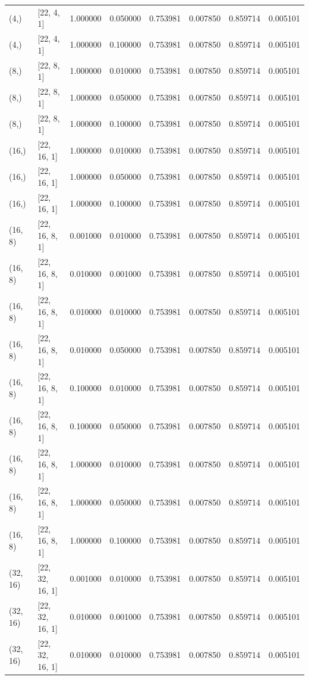 \begin{tabular}{llrrrrrr}
(4,) & [22, 4, 1] & 1.000000 & 0.050000 & 0.753981 & 0.007850 & 0.859714 & 0.005101 \\
(4,) & [22, 4, 1] & 1.000000 & 0.100000 & 0.753981 & 0.007850 & 0.859714 & 0.005101 \\
(8,) & [22, 8, 1] & 1.000000 & 0.010000 & 0.753981 & 0.007850 & 0.859714 & 0.005101 \\
(8,) & [22, 8, 1] & 1.000000 & 0.050000 & 0.753981 & 0.007850 & 0.859714 & 0.005101 \\
(8,) & [22, 8, 1] & 1.000000 & 0.100000 & 0.753981 & 0.007850 & 0.859714 & 0.005101 \\
(16,) & [22, 16, 1] & 1.000000 & 0.010000 & 0.753981 & 0.007850 & 0.859714 & 0.005101 \\
(16,) & [22, 16, 1] & 1.000000 & 0.050000 & 0.753981 & 0.007850 & 0.859714 & 0.005101 \\
(16,) & [22, 16, 1] & 1.000000 & 0.100000 & 0.753981 & 0.007850 & 0.859714 & 0.005101 \\
(16, 8) & [22, 16, 8, 1] & 0.001000 & 0.010000 & 0.753981 & 0.007850 & 0.859714 & 0.005101 \\
(16, 8) & [22, 16, 8, 1] & 0.010000 & 0.001000 & 0.753981 & 0.007850 & 0.859714 & 0.005101 \\
(16, 8) & [22, 16, 8, 1] & 0.010000 & 0.010000 & 0.753981 & 0.007850 & 0.859714 & 0.005101 \\
(16, 8) & [22, 16, 8, 1] & 0.010000 & 0.050000 & 0.753981 & 0.007850 & 0.859714 & 0.005101 \\
(16, 8) & [22, 16, 8, 1] & 0.100000 & 0.010000 & 0.753981 & 0.007850 & 0.859714 & 0.005101 \\
(16, 8) & [22, 16, 8, 1] & 0.100000 & 0.050000 & 0.753981 & 0.007850 & 0.859714 & 0.005101 \\
(16, 8) & [22, 16, 8, 1] & 1.000000 & 0.010000 & 0.753981 & 0.007850 & 0.859714 & 0.005101 \\
(16, 8) & [22, 16, 8, 1] & 1.000000 & 0.050000 & 0.753981 & 0.007850 & 0.859714 & 0.005101 \\
(16, 8) & [22, 16, 8, 1] & 1.000000 & 0.100000 & 0.753981 & 0.007850 & 0.859714 & 0.005101 \\
(32, 16) & [22, 32, 16, 1] & 0.001000 & 0.010000 & 0.753981 & 0.007850 & 0.859714 & 0.005101 \\
(32, 16) & [22, 32, 16, 1] & 0.010000 & 0.001000 & 0.753981 & 0.007850 & 0.859714 & 0.005101 \\
(32, 16) & [22, 32, 16, 1] & 0.010000 & 0.010000 & 0.753981 & 0.007850 & 0.859714 & 0.005101 \\

\end{tabular}
